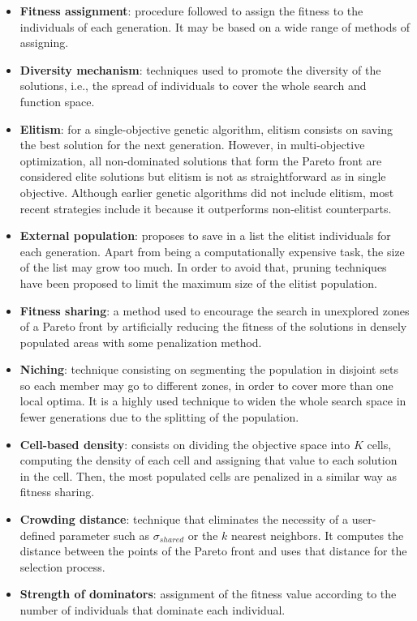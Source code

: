     \begin{itemize}[label={--}]
        \item \textbf{Fitness assignment}: procedure followed to assign the fitness to the individuals of each generation. It may be based on a wide range of methods of assigning.
        \item \textbf{Diversity mechanism}: techniques used to promote the diversity of the solutions, i.e., the spread of individuals to cover the whole search and function space.
        
        \newpage
        
        \item \textbf{Elitism}: for a single-objective genetic algorithm, elitism consists on saving the best solution for the next generation. However, in multi-objective optimization, all non-dominated solutions that form the Pareto front are considered elite solutions but elitism is not as straightforward as in single objective. Although earlier genetic algorithms did not include elitism, most recent strategies include it because it outperforms non-elitist counterparts.
        \item \textbf{External population}: proposes to save in a list the elitist individuals for each generation. Apart from being a computationally expensive task, the size of the list may grow too much. In order to avoid that, pruning techniques have been proposed to limit the maximum size of the elitist population.
        \item \textbf{Fitness sharing}: a method used to encourage the search in unexplored zones of a Pareto front by artificially reducing the fitness of the solutions in densely populated areas with some penalization method.
        \item \textbf{Niching}: technique consisting on segmenting the population in disjoint sets so each member may go to different zones, in order to cover more than one local optima. It is a highly used technique to widen the whole search space in fewer generations due to the splitting of the population.
        \item \textbf{Cell-based density}: consists on dividing the objective space into $K$ cells, computing the density of each cell and assigning that value to each solution in the cell. Then, the most populated cells are penalized in a similar way as fitness sharing.
        \item \textbf{Crowding distance}: technique that eliminates the necessity of a user-defined parameter such as $\sigma_{shared}$ or the $k$ nearest neighbors. It computes the distance between the points of the Pareto front and uses that distance for the selection process.
        \item \textbf{Strength of dominators}: assignment of the fitness value according to the number of individuals that dominate each individual.
    \end{itemize}
    
